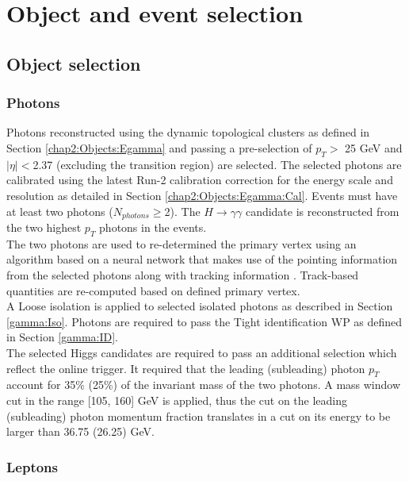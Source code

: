 \section{Object and event selection}
\label{HHyybb:ObjEvt}

\subsection{Object selection}
\label{HHyybb:ObjEvt:Obj}

\subsubsection{Photons}
\label{HHyybb:ObjEvt:Obj:gamma}
Photons reconstructed using the dynamic topological clusters as defined in Section \ref{chap2:Objects:Egamma} and passing a pre-selection of $p_T > $ 25 GeV and $|\eta| < $2.37 (excluding the transition region) are selected. The selected photons are calibrated using the latest Run-2 calibration correction for the energy scale and resolution as detailed in Section \ref{chap2:Objects:Egamma:Cal}. Events must have at least two photons ($N_{photons} \geq $2). The $H\to\gamma\gamma$ candidate is reconstructed from the two highest $p_T$ photons in the events. \\
The two photons are used to re-determined the primary vertex using an algorithm based on a neural network that makes use of the pointing information from the selected photons along with tracking information \cite{DiPhotonVertex}. Track-based quantities are re-computed based on defined primary vertex. \\
A Loose isolation is applied to selected isolated photons as described in Section \ref{gamma:Iso}. Photons are required to pass the Tight identification WP as defined in Section \ref{gamma:ID}. \\
The selected Higgs candidates are required to pass an additional selection which reflect the online trigger. It required that the leading (subleading) photon $p_T$ account for 35\% (25\%) of the invariant mass of the two photons. A mass window cut in the range [105, 160] GeV is applied, thus the cut on the leading (subleading) photon momentum fraction translates in a cut on its energy to be larger than 36.75 (26.25) GeV.

\subsubsection{Leptons}
\label{HHyybb:ObjEvt:Obj:lepton}

